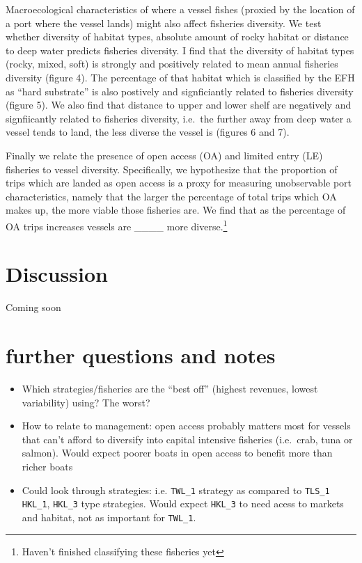\documentclass[]{article}
\let\rmarkdownfootnote\footnote%
\def\footnote{\protect\rmarkdownfootnote}
\begin{document}
Macroecological characteristics of where a vessel fishes (proxied by the
location of a port where the vessel lands) might also affect fisheries
diversity. We test whether diversity of habitat types, absolute amount
of rocky habitat or distance to deep water predicts fisheries diversity.
I find that the diversity of habitat types (rocky, mixed, soft) is
strongly and positively related to mean annual fisheries diversity
(figure 4). The percentage of that habitat which is classified by the
EFH as ``hard substrate'' is also postively and signficiantly related to
fisheries diversity (figure 5). We also find that distance to upper and
lower shelf are negatively and signfiicantly related to fisheries
diversity, i.e.~the further away from deep water a vessel tends to land,
the less diverse the vessel is (figures 6 and 7).

Finally we relate the presence of open access (OA) and limited entry
(LE) fisheries to vessel diversity. Specifically, we hypothesize that
the proportion of trips which are landed as open access is a proxy for
measuring unobservable port characteristics, namely that the larger the
percentage of total trips which OA makes up, the more viable those
fisheries are. We find that as the percentage of OA trips increases
vessels are \_\_\_\_ more diverse.\footnote{Haven't finished classifying
  these fisheries yet}

\section{Discussion}\label{discussion}

Coming soon

\section{further questions and notes}\label{further-questions-and-notes}

\begin{itemize}
\itemsep1pt\parskip0pt
\item
  Which strategies/fisheries are the ``best off'' (highest revenues,
  lowest variability) using? The worst?
\item
  How to relate to management: open access probably matters most for
  vessels that can't afford to diversify into capital intensive
  fisheries (i.e.~crab, tuna or salmon). Would expect poorer boats in
  open access to benefit more than richer boats
\item
  Could look through strategies: i.e. \texttt{TWL\_1} strategy as
  compared to \texttt{TLS\_1} \texttt{HKL\_1}, \texttt{HKL\_3} type
  strategies. Would expect \texttt{HKL\_3} to need acess to markets and
  habitat, not as important for \texttt{TWL\_1}.
\end{itemize}
\end{document}
